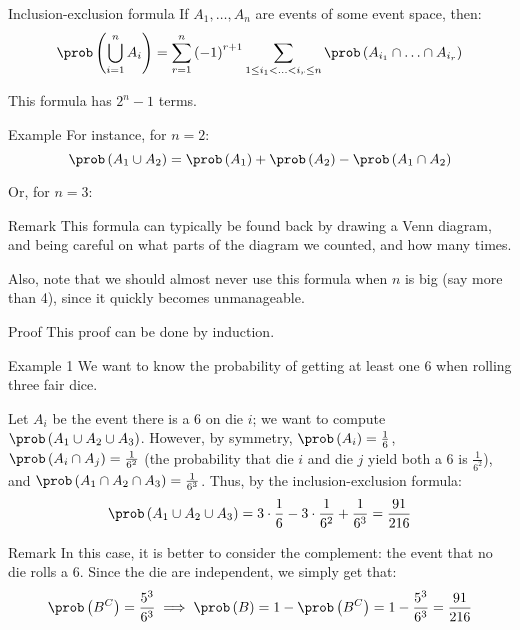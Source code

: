 \documentclass[a4paper]{article}
\begin{document}
\begin{parag}{Inclusion-exclusion formula}
    If $A_1, \ldots, A_n$ are events of some event space, then: 
    \[\prob\left(\bigcup_{i=1}^n A_i\right) = \sum_{r=1}^{n} \left(-1\right)^{r+1} \sum_{1 \leq i_1 < \ldots < i_r \leq n}^{} \prob\left(A_{i_1} \cap \ldots \cap A_{i_r}\right)\]

    This formula has $2^n - 1$ terms.
    
    \begin{subparag}{Example}
        For instance, for $n = 2$: 
        \[\prob\left(A_1 \cup A_2\right) = \prob\left(A_1\right) + \prob\left(A_2\right) - \prob\left(A_1 \cap A_2\right)\]
        
        Or, for $n =3$: 
    \end{subparag}
    
    \begin{subparag}{Remark}
        This formula can typically be found back by drawing a Venn diagram, and being careful on what parts of the diagram we counted, and how many times.

        Also, note that we should almost never use this formula when $n$ is big (say more than 4), since it quickly becomes unmanageable. 
    \end{subparag}

    \begin{subparag}{Proof}
        This proof can be done by induction.
    \end{subparag}
    
\end{parag}

\begin{parag}{Example 1}
    We want to know the probability of getting at least one 6 when rolling three fair dice. 

    Let $A_i$ be the event there is a 6 on die $i$; we want to compute $\prob\left(A_1 \cup A_2 \cup A_3\right)$. However, by symmetry, $\prob\left(A_i\right) = \frac{1}{6}$, $\prob\left(A_i \cap A_j\right) = \frac{1}{6^2}$ (the probability that die $i$ and die $j$ yield both a 6 is $\frac{1}{6^2}$), and $\prob\left(A_1 \cap A_2 \cap A_3\right) = \frac{1}{6^3}$. Thus, by the inclusion-exclusion formula: 
    \[\prob\left(A_1 \cup A_2 \cup A_3\right) = 3\cdot \frac{1}{6} - 3\cdot \frac{1}{6^2} + \frac{1}{6^3} = \frac{91}{216}\]

    \begin{subparag}{Remark}
        In this case, it is better to consider the complement: the event that no die rolls a 6. Since the die are independent, we simply get that: 
        \[\prob\left(B^C\right) = \frac{5^3}{6^3} \implies \prob\left(B\right) = 1 - \prob\left(B^C\right) = 1 - \frac{5^3}{6^3} = \frac{91}{216}\]
    \end{subparag}
\end{parag}
\end{document}
